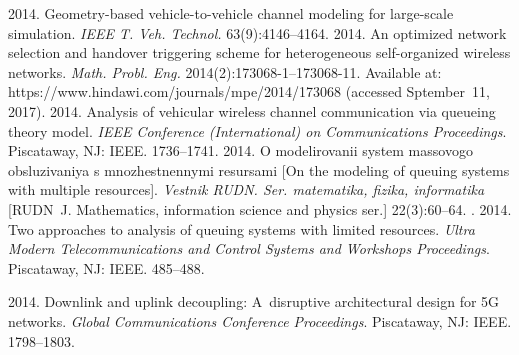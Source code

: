 
  \begin{multicols}{2}

\renewcommand{\bibname}{\protect\rmfamily References}

{\small\frenchspacing
 {%
 \begin{thebibliography}{99}
 2014. Geometry-based vehicle-to-vehicle 
channel modeling for large-scale simulation. \textit{IEEE T. Veh. Technol.} 
63(9):4146--4164.
 2014. An optimized network selection and handover triggering 
scheme for heterogeneous self-organized wireless networks. \textit{Math. Probl. 
Eng.} 2014(2):173068-1--173068-11. 
Available at: {\sf 
https://www.hindawi.com/journals/mpe/2014/173068} (accessed Sptember~11, 2017).
2014. Analysis of vehicular wireless channel communication via queueing theory model. 
\textit{IEEE Conference (International) on Communications Proceedings}.  Piscataway, NJ:
IEEE. 1736--1741.
 2014. O modelirovanii system massovogo 
obsluzivaniya s mnozhestnennymi resursami [On the modeling of queuing systems with 
multiple resources]. \textit{Vestnik RUDN. Ser. matematika, fizika, informatika} [RUDN~J. 
Mathematics, information science and physics ser.] 22(3):60--64.
. 2014. Two approaches to 
analysis of queuing systems with limited resources. \textit{Ultra Modern Telecommunications 
and Control Systems and Workshops Proceedings}. Piscataway, NJ: IEEE.  
485--488. 

 2014. Downlink and uplink 
decoupling: A~disruptive architectural design for 5G networks. \textit{Global 
Communications Conference Proceedings}. Piscataway, NJ: IEEE. 1798--1803.


\end{thebibliography}}}
\end{multicols}
